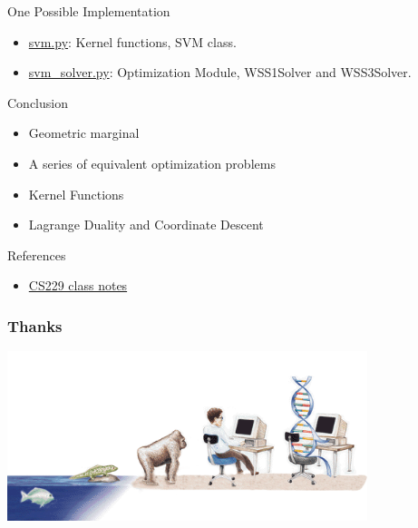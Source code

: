 \documentclass{beamer}
\begin{document}
\begin{frame}{One Possible Implementation}
\begin{itemize}
\item \href{https://github.com/Irlyue/MLAlg/blob/master/code/svm/svm.py}{svm.py}: Kernel functions, SVM class.
\item\href{https://github.com/Irlyue/MLAlg/blob/master/code/svm/svm_solver.py}{svm\_solver.py}: Optimization Module, WSS1Solver and WSS3Solver.
\end{itemize}
\end{frame}

\begin{frame}{Conclusion}
\begin{itemize}
\item Geometric marginal
\item A series of equivalent optimization problems
\item Kernel Functions
\item Lagrange Duality and Coordinate Descent
\end{itemize}
\end{frame}




\begin{frame}{References}
\begin{itemize}
\item \href{http://cs229.stanford.edu/notes/cs229-notes3.pdf}{CS229 class notes}
\end{itemize}
\end{frame}


\begin{frame}
\frametitle{Thanks}
\begin{center}
\includegraphics[width=10.5cm]{Z.png}

\end{center}
\end{frame}

\end{document}
